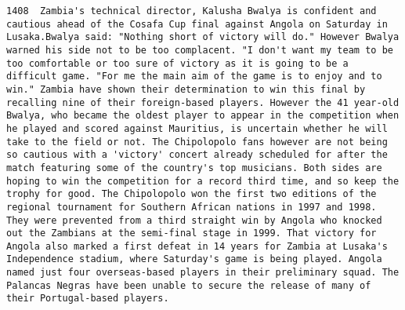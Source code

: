 \documentclass[11pt]{article}
\begin{document}
\begin{Verbatim}[commandchars=\\\{\}]
         1408  Zambia's technical director, Kalusha Bwalya is confident and cautious ahead of the Cosafa Cup final against Angola on Saturday in Lusaka.Bwalya said: "Nothing short of victory will do." However Bwalya warned his side not to be too complacent. "I don't want my team to be too comfortable or too sure of victory as it is going to be a difficult game. "For me the main aim of the game is to enjoy and to win." Zambia have shown their determination to win this final by recalling nine of their foreign-based players. However the 41 year-old Bwalya, who became the oldest player to appear in the competition when he played and scored against Mauritius, is uncertain whether he will take to the field or not. The Chipolopolo fans however are not being so cautious with a 'victory' concert already scheduled for after the match featuring some of the country's top musicians. Both sides are hoping to win the competition for a record third time, and so keep the trophy for good. The Chipolopolo won the first two editions of the regional tournament for Southern African nations in 1997 and 1998. They were prevented from a third straight win by Angola who knocked out the Zambians at the semi-final stage in 1999. That victory for Angola also marked a first defeat in 14 years for Zambia at Lusaka's Independence stadium, where Saturday's game is being played. Angola named just four overseas-based players in their preliminary squad. The Palancas Negras have been unable to secure the release of many of their Portugal-based players.                                                                                                                                                                                                                                                                                                                                                                                                                                                                                                                                                                                                                                                                                                                                                                                                                                                                                                                                                                                                                                                                                                                                                                                                                                                                                                                                                                                                                                                                                                                                         
         

\end{Verbatim}
\end{document}
